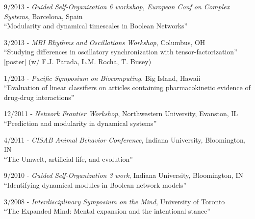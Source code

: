 \documentclass[margin,line,centered]{res}
\begin{document}
\begin{resume}
9/2013 - \emph{Guided Self-Organization 6 workshop, European Conf on Complex Systems}, Barcelona, Spain\\
``Modularity and dynamical timescales in Boolean Networks'' %

3/2013 - \emph{MBI Rhythms and Oscillations Workshop}, Columbus, OH\\
``Studying differences in oscillatory synchronization with tensor-factorization'' [poster]
(w/ F.J. Parada, L.M. Rocha, T. Busey)

1/2013 - \emph{Pacific Symposium on Biocomputing}, Big Island, Hawaii\\
``Evaluation of linear classifiers on articles containing pharmacokinetic evidence
 of drug-drug interactions'' %


12/2011 - \emph{Network Frontier Workshop}, Northwestern University, Evanston, IL\\
``Prediction and modularity in dynamical systems''


4/2011 - %
\emph{CISAB Animal Behavior Conference}, Indiana University, Bloomington, IN\\
``The Umwelt, artificial life, and evolution''

9/2010 - \emph{Guided Self-Organization 3 work}, Indiana University, Bloomington, IN\\
``Identifying dynamical modules in Boolean network models''

3/2008 - \emph{Interdisciplinary Symposium on the Mind}, University of Toronto\\
``The Expanded Mind: Mental expansion and the intentional stance''




\end{resume}
\end{document}
